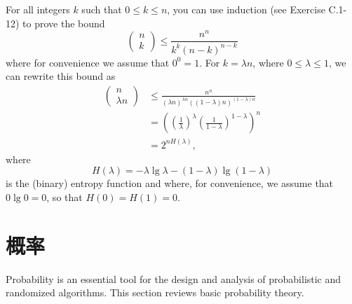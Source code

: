 \documentclass[lang=cn,newtx,10pt,scheme=chinese]{elegantbook}
\begin{document}
For all integers $k$ such that $0 \leq k \leq n$, you can use induction (see Exercise C.1-12) to prove the bound
$$
\left(\begin{array}{l}
n \\
k
\end{array}\right) \leq \frac{n^n}{k^k(n-k)^{n-k}}
$$
where for convenience we assume that $0^0=1$. For $k=\lambda n$, where $0 \leq \lambda \leq 1$, we can rewrite this bound as
$$
\begin{aligned}
\left(\begin{array}{c}
n \\
\lambda n
\end{array}\right) & \leq \frac{n^n}{(\lambda n)^{\lambda n}((1-\lambda) n)^{(1-\lambda) n}} \\
& =\left(\left(\frac{1}{\lambda}\right)^\lambda\left(\frac{1}{1-\lambda}\right)^{1-\lambda}\right)^n \\
& =2^{n H(\lambda)},
\end{aligned}
$$
where
$$
H(\lambda)=-\lambda \lg \lambda-(1-\lambda) \lg (1-\lambda)
$$
is the (binary) entropy function and where, for convenience, we assume that $0 \lg 0=0$, so that $H(0)=H(1)=0$.

\section{概率}

Probability is an essential tool for the design and analysis of probabilistic and randomized algorithms. This section reviews basic probability theory.
\end{document}
